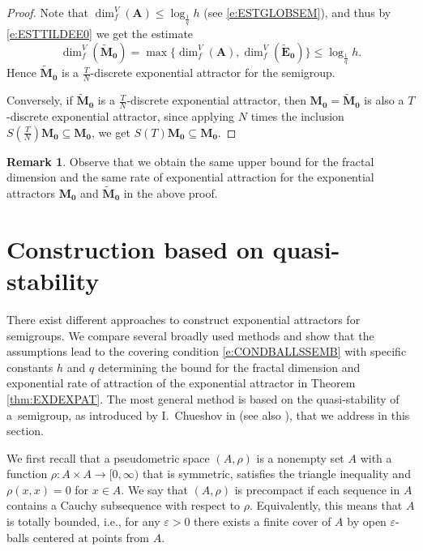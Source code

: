 \documentclass[a4paper,12pt,reqno]{amsart}
\theoremstyle{plain}
\theoremstyle{definition}
\newtheorem{rem}[lem]{Remark}
\numberwithin{equation}{section}
\newcommand{\eps}{\varepsilon}
\newcommand{\dimf}{\operatorname{dim}_{f}}
\renewcommand{\leq}{\leqslant}
\begin{document}
\begin{proof}
Note that  $\dimf^{V}(\mathbf{A})\leq\log_{\frac{1}{q}}h$ (see \eqref{e:ESTGLOBSEM}), and thus by \eqref{e:ESTTILDEE0}
we get the estimate
$$\dimf^{V}(\mathbf{\widetilde{M}_0})=\max\{\dimf^{V}(\mathbf{A}),\dimf^{V}(\mathbf{\widetilde{E}_0})\}\leq\log_{\frac{1}{q}}h.$$ 
Hence $\mathbf{\widetilde{M}_0}$ is a $\frac{T}{N}$-discrete exponential attractor for the semigroup.

Conversely, if $\mathbf{\widetilde{M}_0}$ is a $\frac{T}{N}$-discrete exponential attractor, then $\mathbf{M_0}=\mathbf{\widetilde{M}_0}$ is also a $T$-discrete exponential attractor, since applying $N$ times the inclusion $S(\frac{T}{N})\mathbf{M_0}\subseteq\mathbf{M_0}$, we get $S(T)\mathbf{M_0}\subseteq\mathbf{M_0}$. 
\end{proof}

\begin{rem}
Observe that we obtain the same upper bound for the fractal dimension and the same rate of exponential attraction for  
the exponential attractors $\mathbf{M_0}$ and $\mathbf{\widetilde{M}_0}$  in the above proof.
\end{rem}

\section{Construction based on quasi-stability}\label{sec:QS}

There exist different approaches to construct exponential attractors for semigroups.
We compare several broadly used methods and show that the assumptions lead to the covering condition \eqref{e:CONDBALLSSEMB} with specific constants $h$ and $q$ determining the bound for the fractal dimension and exponential rate of attraction of the exponential attractor in Theorem \ref{thm:EXDEXPAT}. The most general method is based on the quasi-stability of a~semigroup, as introduced by I.~Chueshov in \cite[Definition 3.4.1]{chueshov} (see also \cite{cl2008}), that we address in this section. 
  
We first recall that a pseudometric space $(A,\rho)$ is a nonempty set $A$ with a function $\rho\colon A\times A\to[0,\infty)$ that
is symmetric, satisfies the triangle inequality and $\rho(x,x)=0$ for $x\in A$. We say that $(A,\rho)$ is precompact
 if each sequence in $A$ contains a Cauchy subsequence with respect to $\rho$.
Equivalently, this means that $A$ is totally bounded, i.e., for any $\eps>0$ there exists
a finite cover of $A$ by open $\eps$-balls centered at points from $A$.
\end{document}
